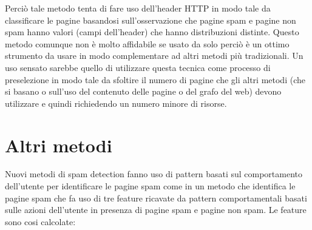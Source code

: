 Perciò tale metodo tenta di fare uso dell'header HTTP in modo tale da classificare le pagine basandosi sull'osservazione che pagine spam e pagine non spam	 hanno valori (campi dell'header) che hanno distribuzioni distinte. Questo metodo comunque non è molto affidabile se usato da solo perciò è un ottimo strumento da usare in modo complementare ad altri metodi più tradizionali. Un uso sensato sarebbe quello di utilizzare questa tecnica come processo di preselezione in modo tale da sfoltire il numero di pagine che gli altri metodi (che si basano o sull'uso del contenuto delle pagine o del grafo del web) devono utilizzare e quindi richiedendo un numero minore di risorse.

\section{Altri metodi}
 Nuovi metodi di spam detection fanno uso di pattern basati sul comportamento dell'utente per identificare le pagine spam come in \cite{Liu:2008:UBO:1367497.1367645}  un metodo che identifica le pagine spam che fa uso di tre feature ricavate da pattern comportamentali basati sulle azioni dell'utente in presenza di  pagine spam e pagine non spam. Le feature sono cosi calcolate:
